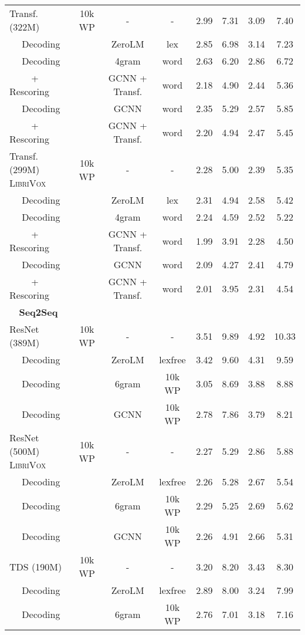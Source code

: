 \documentclass{article}
\newcommand{\librivox}{\textsc{LibriVox}}
\begin{document}
\begin{table*}[!t]
\begin{small}
\begin{sc}
\begin{tabular}{lccccccc}
    \cmidrule(lr){1-1}
    Transf. (322M) & 10k WP & - & - & 2.99 & 7.31 & 3.09 & 7.40 \\
    ~~ Decoding & & ZeroLM & lex & 2.85 & 6.98 & 3.14 & 7.23 \\
    ~~ Decoding & & 4gram & word & 2.63 & 6.20 & 2.86 & 6.72 \\
    ~~~~ + Rescoring &  & GCNN + Transf. & word & 2.18 & 4.90 & 2.44 & 5.36 \\
    ~~ Decoding & & GCNN & word & 2.35 & 5.29 & 2.57 & 5.85 \\
    ~~~~ + Rescoring &  & GCNN + Transf. & word & 2.20 & 4.94 & 2.47 & 5.45 \\
Transf. (299M) \librivox~& 10k WP & - & - & 2.28 & 5.00 & 2.39 & 5.35  \\
    ~~ Decoding & & ZeroLM & lex & 2.31 & 4.94 & 2.58 & 5.42 \\
    ~~ Decoding & & 4gram & word & 2.24 & 4.59 & 2.52 & 5.22 \\
    ~~~~ + Rescoring &  & GCNN + Transf. & word & 1.99 & 3.91 & 2.28 & 4.50 \\
    ~~ Decoding & & GCNN & word & 2.09 & 4.27 & 2.41 & 4.79 \\
    ~~~~ + Rescoring & & GCNN + Transf. & word & 2.01 & 3.95 & 2.31 & 4.54 \\
    \midrule
      \multicolumn{1}{c}{ \textbf{Seq2Seq} } & \\
    ResNet (389M) & 10k WP & - & - & 3.51 & 9.89 & 4.92 & 10.33 \\
    ~~ Decoding & & ZeroLM & lexfree & 3.42 & 9.60 & 4.31 & 9.59 \\
    ~~ Decoding & & 6gram & 10k WP & 3.05 & 8.69 & 3.88 & 8.88 \\
    ~~ Decoding & & GCNN & 10k WP & 2.78 & 7.86 & 3.79 & 8.21 \\
ResNet (500M) \librivox~& 10k WP & - & - & 2.27 & 5.29 & 2.86 & 5.88 \\
    ~~ Decoding & & ZeroLM & lexfree & 2.26 & 5.28 & 2.67 & 5.54 \\
    ~~ Decoding & & 6gram & 10k WP & 2.29 & 5.25 & 2.69 & 5.62 \\
    ~~ Decoding & & GCNN & 10k WP & 2.26 & 4.91 & 2.66 & 5.31 \\
    \cmidrule(lr){1-1}
    TDS (190M) & 10k WP & - & - & 3.20 & 8.20 & 3.43 & 8.30 \\
    ~~ Decoding & & ZeroLM & lexfree & 2.89 & 8.00 & 3.24 & 7.99 \\
    ~~ Decoding & & 6gram & 10k WP & 2.76 & 7.01 & 3.18 & 7.16 \\

\end{tabular}
\end{sc}
\end{small}
\end{table*}
\end{document}
